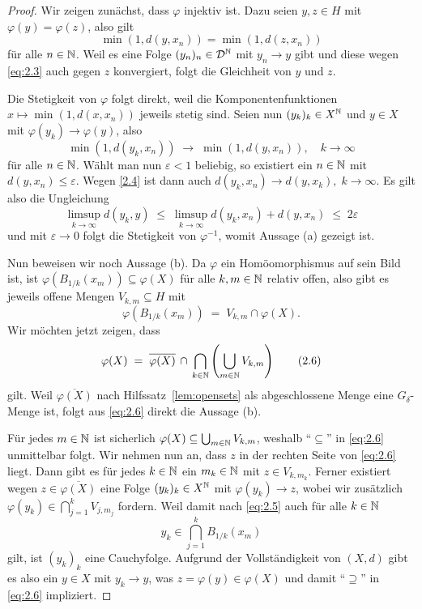 \documentclass[../main/main.tex]{subfiles}
\begin{document}
	\begin{proof}
		Wir zeigen zunächst, dass $\varphi$ injektiv ist. 
		Dazu seien $y, z \in H$ mit $\varphi(y) = \varphi(z)$, also gilt
		\[\min(1, d(y, x_n)) = \min(1, d(z, x_n)) \label{eq:2.3} \tag{2.3}\]
		für alle $n \in \mathbb{N}$. Weil es eine Folge $(y_n)_n \in \mathcal{D}^{\mathbb{N}}$ mit 
		$y_n \to y$ gibt und diese wegen \eqref{eq:2.3} auch gegen $z$ 
		konvergiert, folgt die Gleichheit von $y$ und $z$.
		
		Die Stetigkeit von $\varphi$ folgt direkt, weil die 
		Komponentenfunktionen $x \mapsto \min(1, d(x, x_n))$ jeweils stetig sind. 
		Seien nun $(y_k)_k \in X^{\mathbb{N}}$ und $y \in X$ mit $\varphi(y_k) \to \varphi(y)$, 
		also
		\[\min(1, d(y_k, x_n)) \; \to \; \min(1, d(y, x_n)), 
		\quad k \to \infty \label{2.4} \tag{2.4}\]
		für alle $n \in \mathbb{N}$. Wählt man nun $\varepsilon < 1$ beliebig, 
		so existiert ein $n \in \mathbb{N}$ mit $d(y, x_n) \leq \varepsilon$. 
		Wegen \eqref{2.4} ist dann auch
		$d(y_k, x_n) \to d(y, x_k), \; k \to \infty$. Es gilt also die Ungleichung
		$$\limsup_{k \to \infty} d(y_k, y) \; \leq \; 
		\limsup_{k \to \infty} d(y_k, x_n) + d(y, x_n) \; \leq \; 2\varepsilon$$
		und mit $\varepsilon \to 0$ folgt die Stetigkeit von $\varphi^{-1}$, 
		womit Aussage (a) gezeigt ist.
		
		Nun beweisen wir noch Aussage (b). Da $\varphi$ ein Homöomorphismus auf sein 
		Bild ist, ist $\varphi(B_{1/k}(x_m)) \subseteq \varphi(X)$ für alle 
		$k, m \in \mathbb{N}$ relativ offen, also gibt es jeweils offene Mengen 
		$V_{k, m} \subseteq H$ mit
		\[\varphi(B_{1/k}(x_m)) \; = \; V_{k, m} 
		\cap \varphi(X) \text{.} \label{eq:2.5} \tag{2.5}\]
		Wir möchten jetzt zeigen, dass
		\[\varphi(X) \; = \; \overline{\varphi(X)} \, \cap \, 
		\bigcap_{k \in \mathbb{N}} \left( \bigcup_{m \in \mathbb{N}} V_{k, m} \right) 
		\label{eq:2.6} \tag{2.6}\]
		gilt. 
		Weil $\overline{\varphi(X)}$ nach Hilfssatz~\ref{lem:opensets} 
		als abgeschlossene Menge eine $G_\delta$-Menge ist, 
		folgt aus \eqref{eq:2.6} direkt die Aussage (b).
		
		Für jedes $m \in \mathbb{N}$ ist sicherlich $\varphi(X) \subseteq 
		\bigcup_{m \in \mathbb{N}} V_{k, m}$, weshalb \enquote{$\subseteq$} 
		in \eqref{eq:2.6} unmittelbar folgt.
		Wir nehmen nun an, dass $z$ in der rechten Seite von \eqref{eq:2.6} liegt. 
		Dann gibt es für jedes $k \in \mathbb{N}$ ein $m_k \in \mathbb{N}$ mit $z \in V_{k, m_k}$. 
		Ferner existiert wegen $z \in \overline{\varphi(X)}$ eine Folge $(y_k)_k \in X^{\mathbb{N}}$ 
		mit $\varphi(y_k) \to z$, wobei wir zusätzlich
		$\varphi(y_k) \in \bigcap_{j=1}^{k} V_{j, m_j}$
		fordern. Weil damit nach \eqref{eq:2.5} auch für alle $k \in \mathbb{N}$
		\[y_k \in \bigcap_{j=1}^{k} B_{1/k}(x_m)\]
		gilt, ist $(y_k)_k$ eine Cauchyfolge. Aufgrund der Vollständigkeit von 
		$(X, d)$ gibt es also ein $y \in X$ mit $y_k \to y$, was 
		$z = \varphi(y) \in \varphi(X)$ und damit \enquote{$\supseteq$} 
		in \eqref{eq:2.6} impliziert.
	\end{proof}
\end{document}
